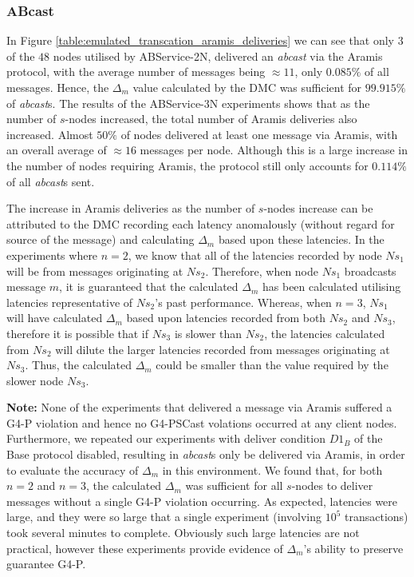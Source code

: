 	\subsubsection*{ABcast}
	In Figure \ref{table:emulated_transcation_aramis_deliveries} we can see that only $3$ of the $48$ nodes utilised by ABService-2N, delivered an \emph{abcast} via the \textsf{Aramis} protocol, with the average number of messages being $\approx 11$, only $0.085\%$ of all messages.  Hence, the $\Delta_m$ value calculated by the DMC was sufficient for  $99.915\%$ of \emph{abcast}s.  The results of the ABService-3N experiments shows that as the number of $s$-nodes increased,  the total number of \textsf{Aramis} deliveries also increased.  Almost $50\%$ of nodes delivered at least one message via \textsf{Aramis}, with an overall average of $\approx 16$ messages per node.  Although this is a large increase in the number of nodes requiring \textsf{Aramis}, the protocol still only accounts for $0.114\%$ of all \emph{abcast}s sent.  
	
	The increase in \textsf{Aramis} deliveries as the number of $s$-nodes increase can be attributed to the DMC recording each latency anomalously (without regard for source of the message) and calculating $\Delta_m$ based upon these latencies.  In the experiments where $n=2$, we know that all of the latencies recorded by node $Ns_1$ will be from messages originating at $Ns_2$.  Therefore, when node $Ns_1$ broadcasts message $m$, it is guaranteed that the calculated $\Delta_m$ has been calculated utilising latencies representative of $Ns_2$'s past performance.  Whereas, when $n=3$, $Ns_1$ will have calculated $\Delta_m$ based upon latencies recorded from both $Ns_2$ and $Ns_3$, therefore it is possible that if $Ns_3$ is slower than $Ns_2$, the latencies calculated from $Ns_2$ will dilute the larger latencies recorded from messages originating at $Ns_3$.  Thus, the calculated $\Delta_m$ could be smaller than the value required by the slower node $Ns_3$.  
	
	\textbf{Note:} None of the experiments that delivered a message via \textsf{Aramis} suffered a G4-P violation and hence no G4-PSCast volations occurred at any client nodes.  Furthermore, we repeated our experiments with deliver condition $D1_B$ of the \textsf{Base} protocol disabled, resulting in \emph{abcast}s only be delivered via \textsf{Aramis}, in order to evaluate the accuracy of $\Delta_m$ in this environment.  We found that, for both $n=2$ and $n=3$, the calculated $\Delta_m$ was sufficient for all $s$-nodes to deliver messages without a single G4-P violation occurring.  As expected, latencies were large, and they were so large that a single experiment (involving $10^5$ transactions) took several minutes to complete.  Obviously such large latencies are not practical, however these experiments provide evidence of $\Delta_m$'s ability to preserve guarantee G4-P.  
		
